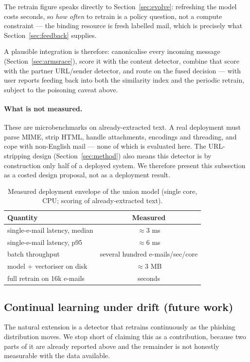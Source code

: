 \documentclass[11pt]{article}
\begin{document}
The retrain figure speaks directly to Section~\ref{sec:evolve}: refreshing the model costs seconds,
so \emph{how often} to retrain is a policy question, not a compute constraint --- the binding
resource is fresh labelled mail, which is precisely what Section~\ref{sec:feedback} supplies.

A plausible integration is therefore: canonicalise every incoming message
(Section~\ref{sec:armsrace}), score it with the content detector, combine that score with the
partner URL/sender detector, and route on the fused decision --- with user reports feeding back into
both the similarity index and the periodic retrain, subject to the poisoning caveat above.

\paragraph{What is not measured.} These are microbenchmarks on already-extracted text. A real
deployment must parse MIME, strip HTML, handle attachments, encodings and threading, and cope with
non-English mail --- none of which is evaluated here. The URL-stripping design
(Section~\ref{sec:method}) also means this detector is by construction only half of a deployed
system. We therefore present this subsection as a costed design proposal, not as a deployment result.

\begin{table}[t]
\centering
\caption{Measured deployment envelope of the union model (single core, CPU; scoring of
already-extracted text).}
\label{tab:deploy}
\begin{tabular}{lc}
\toprule
Quantity & Measured \\
\midrule
single-e-mail latency, median      & $\approx 3$ ms \\
single-e-mail latency, p95         & $\approx 6$ ms \\
batch throughput                   & several hundred e-mails/sec/core \\
model + vectoriser on disk         & $\approx 3$ MB \\
full retrain on 16k e-mails        & seconds \\
\bottomrule
\end{tabular}
\end{table}

\subsection{Continual learning under drift (future work)}
\label{sec:continual}
The natural extension is a detector that retrains continuously as the phishing distribution moves.
We stop short of claiming this as a contribution, because two parts of it are already reported above
and the remainder is not honestly measurable with the data available.
\end{document}
